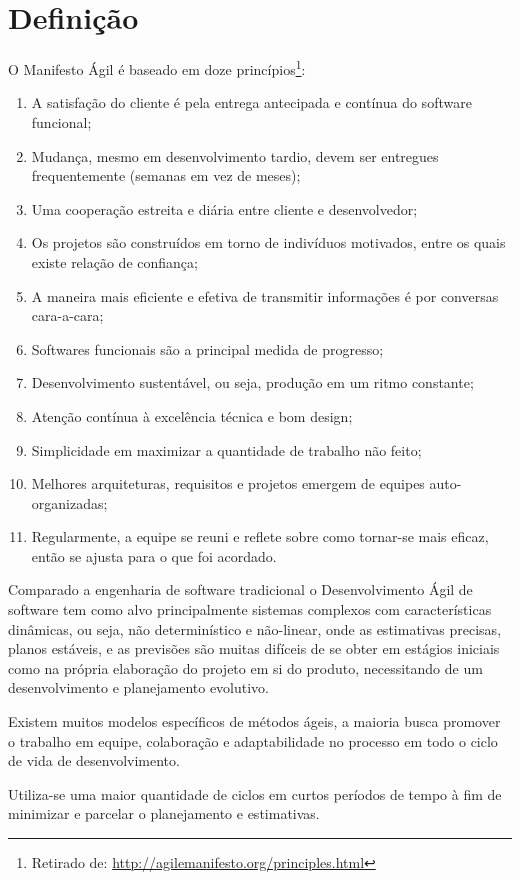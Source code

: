 \section{Definição}
\par O Manifesto Ágil é baseado em doze princípios\footnote{ Retirado de: \url{http://agilemanifesto.org/principles.html}}:
\begin{enumerate}
  \item A satisfação do cliente é pela entrega antecipada e contínua do software funcional;
  \item Mudança, mesmo em desenvolvimento tardio, devem ser entregues frequentemente (semanas em vez de meses);
  \item Uma cooperação estreita e diária entre cliente e desenvolvedor;
  \item Os projetos são construídos em torno de indivíduos motivados, entre os quais existe relação de confiança;
  \item A maneira mais eficiente e efetiva de transmitir informações é por conversas cara-a-cara;
  \item Softwares funcionais são a principal medida de progresso;
  \item Desenvolvimento sustentável, ou seja, produção em um ritmo constante;
  \item Atenção contínua à excelência técnica e bom design;
  \item Simplicidade em maximizar a quantidade de trabalho não feito;
  \item Melhores arquiteturas, requisitos e projetos emergem de equipes auto-organizadas;
  \item Regularmente, a equipe se reuni e reflete sobre como tornar-se mais eficaz, então se ajusta para o que foi acordado.
\end{enumerate}
\par Comparado a engenharia de software tradicional o Desenvolvimento Ágil de software tem como alvo principalmente sistemas complexos com características dinâmicas, ou seja, não determinístico e não-linear, onde as estimativas precisas, planos estáveis, e as previsões são muitas difíceis de se obter em estágios iniciais como na própria elaboração do projeto em si do produto, necessitando de um desenvolvimento e planejamento evolutivo.
\par Existem muitos modelos específicos de métodos ágeis, a maioria busca promover o trabalho em equipe, colaboração e adaptabilidade no processo em todo o ciclo de vida de desenvolvimento. 
\par Utiliza-se uma maior quantidade de ciclos em curtos períodos de tempo à fim de minimizar e parcelar o planejamento e estimativas.
